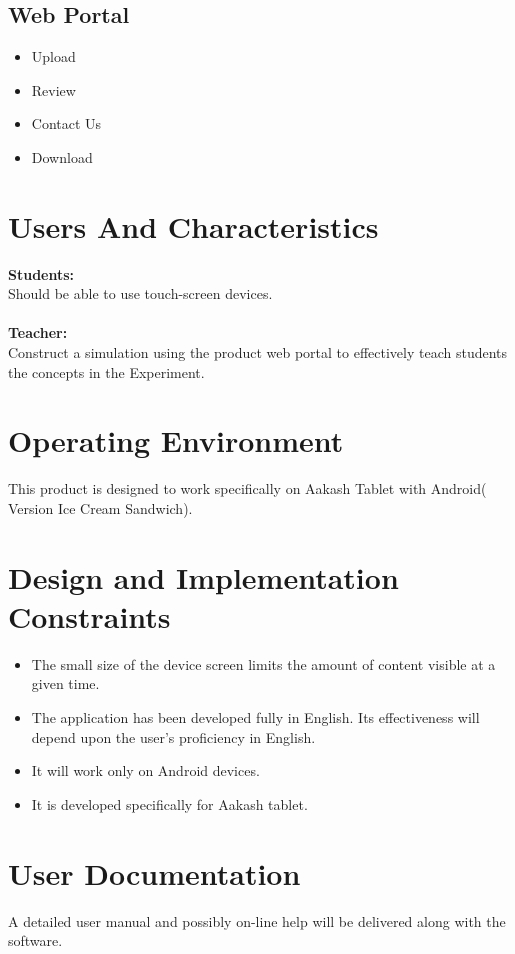 \documentclass[12pt]{report}
\begin{document}
\subsection{Web Portal}

\begin{itemize}
\item Upload
\item Review
\item Contact Us
\item Download
\end{itemize}

\section{Users And Characteristics}

\textbf{Students: }
\\
Should be able to use touch-screen devices.\\
\\
\textbf{Teacher: }
\\
Construct a simulation  using the product web portal  to effectively teach students the concepts in the Experiment. 
\\
\section{Operating Environment}
This product is designed to work specifically on Aakash Tablet with Android( Version Ice Cream Sandwich). 
\section{Design and Implementation Constraints}
\begin{itemize}
\item The small size of the device screen limits the amount of content visible at a given time. 
\item The application has been developed fully in English. Its effectiveness will depend upon the user's proficiency in English. 
\item It will work only on Android devices. 
\item It is developed specifically for Aakash tablet. 
\end{itemize}
\section{User Documentation}
A detailed user manual and possibly on-line help will be delivered along with the 
software. 
\end{document}
